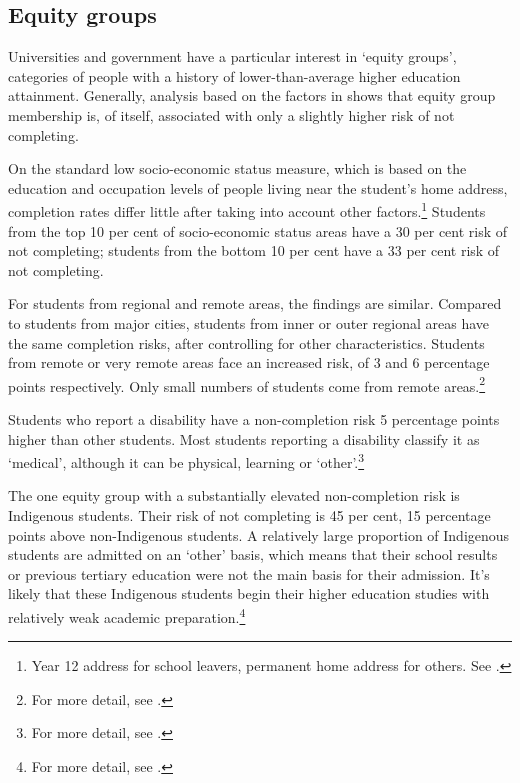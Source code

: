 \subsection{Equity groups}\label{subsec:3.1.4}

Universities and government have a particular interest in `equity groups', categories of people with a history of lower-than-average higher education attainment. Generally, analysis based on the factors in  shows that equity group membership is, of itself, associated with only a slightly higher risk of not completing.

On the standard low socio-economic status measure, which is based on the education and occupation levels of people living near the student's home address, completion rates differ little after taking into account other factors.\footnote{Year 12 address for school leavers, permanent home address for others. See \textcite[][section~5.5]{Cherastidtham2018a}.} Students from the top 10 per cent of socio-economic status areas have a 30 per cent risk of not completing; students from the bottom 10 per cent have a 33 per cent risk of not completing.

For students from regional and remote areas, the findings are similar. Compared to students from major cities, students from inner or outer regional areas have the same completion risks, after controlling for other characteristics. Students from remote or very remote areas face an increased risk, of 3 and 6 percentage points respectively. Only small numbers of students come from remote areas.\footnote{For more detail, see \textcite[][section~5.6]{Cherastidtham2018a}.}

Students who report a disability have a non-completion risk 5 percentage points higher than other students. Most students reporting a disability classify it as `medical', although it can be physical, learning or `other'.\footnote{For more detail, see \textcite[][section~5.2]{Cherastidtham2018a}.}

The one equity group with a substantially elevated non-completion risk is Indigenous students. Their risk of not completing is 45 per cent, 15 percentage points above non-Indigenous students. A relatively large proportion of Indigenous students are admitted on an `other' basis, which means that their school results or previous tertiary education were not the main basis for their admission. It's likely that these Indigenous students begin their higher education studies with relatively weak academic preparation.\footnote{For more detail, see \textcite[][section~5.3]{Cherastidtham2018a}.}

